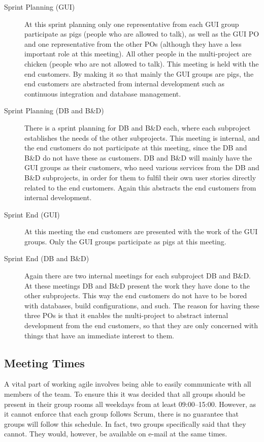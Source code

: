 \begin{description}
  \item[Sprint Planning (GUI)] At this sprint planning only one representative from each GUI group participate as pigs (people who are allowed to talk), as well as the GUI PO and one representative from the other POs (although they have a less important role at this meeting). All other people in the multi-project are chicken (people who are not allowed to talk). This meeting is held with the end customers. By making it so that mainly the GUI groups are pigs, the end customers are abstracted from internal development such as continuous integration and database management.
  \item[Sprint Planning (DB and B\&D)] There is a sprint planning for DB and B\&D each, where each subproject establishes the needs of the other subprojects. This meeting is internal, and the end customers do not participate at this meeting, since the DB and B\&D do not have these as customers. DB and B\&D will mainly have the GUI groups as their customers, who need various services from the DB and B\&D subprojects, in order for them to fulfil their own user stories directly related to the end customers. Again this abstracts the end customers from internal development.
  \item[Sprint End (GUI)] At this meeting the end customers are presented with the work of the GUI groups. Only the GUI groups participate as pigs at this meeting.
  \item[Sprint End (DB and B\&D)] Again there are two internal meetings for each subproject DB and B\&D. At these meetings DB and B\&D present the work they have done to the other subprojects. This way the end customers do not have to be bored with databases, build configurations, and such. The reason for having these three POs is that it enables the multi-project to abstract internal development from the end customers, so that they are only concerned with things that have an immediate interest to them.
\end{description}

\subsection{Meeting Times}
A vital part of working agile involves being able to easily communicate with all members of the team. To ensure this it was decided that all groups should be present in their group rooms all weekdays from at least 09:00--15:00. However, as it cannot enforce that each group follows Scrum, there is no guarantee that groups will follow this schedule. In fact, two groups specifically said that they cannot. They would, however, be available on e-mail at the same times.

